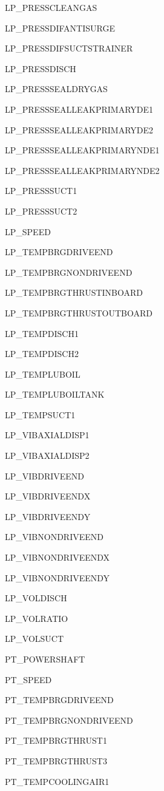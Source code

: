 \documentclass[runningheads]{llncs}
\begin{document}
\begin{multicols}{3}
\begin{enumerate}
{			\item LP\_PRESSCLEANGAS
			\item LP\_PRESSDIFANTISURGE
			\item LP\_PRESSDIFSUCTSTRAINER
			\item LP\_PRESSDISCH
			\item LP\_PRESSSEALDRYGAS
			\item LP\_PRESSSEALLEAKPRIMARYDE1
			\item LP\_PRESSSEALLEAKPRIMARYDE2
			\item LP\_PRESSSEALLEAKPRIMARYNDE1
			\item LP\_PRESSSEALLEAKPRIMARYNDE2
			\item LP\_PRESSSUCT1
			\item LP\_PRESSSUCT2
			\item LP\_SPEED
			\item LP\_TEMPBRGDRIVEEND
			\item LP\_TEMPBRGNONDRIVEEND
			\item LP\_TEMPBRGTHRUSTINBOARD
			\item LP\_TEMPBRGTHRUSTOUTBOARD
			\item LP\_TEMPDISCH1
			\item LP\_TEMPDISCH2
			\item LP\_TEMPLUBOIL
			\item LP\_TEMPLUBOILTANK
			\item LP\_TEMPSUCT1
			\item LP\_VIBAXIALDISP1
			\item LP\_VIBAXIALDISP2
			\item LP\_VIBDRIVEEND
			\item LP\_VIBDRIVEENDX
			\item LP\_VIBDRIVEENDY
			\item LP\_VIBNONDRIVEEND
			\item LP\_VIBNONDRIVEENDX
			\item LP\_VIBNONDRIVEENDY
			\item LP\_VOLDISCH
			\item LP\_VOLRATIO
			\item LP\_VOLSUCT
			\item PT\_POWERSHAFT
			\item PT\_SPEED
			\item PT\_TEMPBRGDRIVEEND
			\item PT\_TEMPBRGNONDRIVEEND
			\item PT\_TEMPBRGTHRUST1
			\item PT\_TEMPBRGTHRUST3
			\item PT\_TEMPCOOLINGAIR1
}
\end{enumerate}
\end{multicols}
\end{document}
